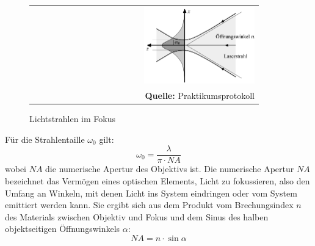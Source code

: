 \documentclass[a4paper,titlepage]{scrartcl}
\numberwithin{equation}{section}
\begin{document}
\begin{figure}[H]
	\centering
	\begin{tabular}{@{}r@{}}
		\includegraphics[width=0.5\textwidth]{images/rayleigh.png}\\
		\footnotesize\sffamily\textbf{Quelle:} Praktikumsprotokoll \cite{protokoll}
	\end{tabular}
	\caption{Lichtstrahlen im Fokus}
    \label{fig:rayleigh}
\end{figure}
Für die Strahlentaille $\omega_0$ gilt:
\begin{equation*}
\omega_0=\frac{\lambda}{\pi \cdot NA}
\end{equation*}
wobei $NA$ die numerische Apertur des Objektivs ist. Die numerische Apertur $NA$ bezeichnet das Vermögen eines optischen Elements, Licht zu fokussieren, also den Umfang an Winkeln, mit denen Licht ins System eindringen oder vom System emittiert werden kann. Sie ergibt sich aus dem Produkt vom Brechungsindex $n$ des Materials zwischen Objektiv und Fokus und dem Sinus des halben objektseitigen Öffnungswinkels $\alpha$:
\begin{equation*}
NA=n\cdot \sin \alpha
\end{equation*}
\end{document}
